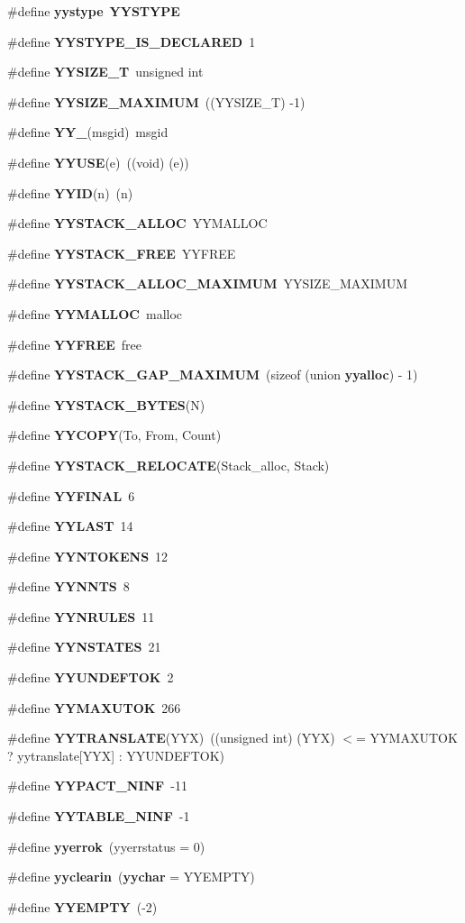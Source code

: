 \begin{DoxyCompactItemize}
\#define {\bf yystype}~{\bf YYSTYPE}
\item 
\#define {\bf YYSTYPE\_\-IS\_\-DECLARED}~1
\item 
\#define {\bf YYSIZE\_\-T}~unsigned int
\item 
\#define {\bf YYSIZE\_\-MAXIMUM}~((YYSIZE\_\-T) -\/1)
\item 
\#define {\bf YY\_\-}(msgid)~msgid
\item 
\#define {\bf YYUSE}(e)~((void) (e))
\item 
\#define {\bf YYID}(n)~(n)
\item 
\#define {\bf YYSTACK\_\-ALLOC}~YYMALLOC
\item 
\#define {\bf YYSTACK\_\-FREE}~YYFREE
\item 
\#define {\bf YYSTACK\_\-ALLOC\_\-MAXIMUM}~YYSIZE\_\-MAXIMUM
\item 
\#define {\bf YYMALLOC}~malloc
\item 
\#define {\bf YYFREE}~free
\item 
\#define {\bf YYSTACK\_\-GAP\_\-MAXIMUM}~(sizeof (union {\bf yyalloc}) -\/ 1)
\item 
\#define {\bf YYSTACK\_\-BYTES}(N)
\item 
\#define {\bf YYCOPY}(To, From, Count)
\item 
\#define {\bf YYSTACK\_\-RELOCATE}(Stack\_\-alloc, Stack)
\item 
\#define {\bf YYFINAL}~6
\item 
\#define {\bf YYLAST}~14
\item 
\#define {\bf YYNTOKENS}~12
\item 
\#define {\bf YYNNTS}~8
\item 
\#define {\bf YYNRULES}~11
\item 
\#define {\bf YYNSTATES}~21
\item 
\#define {\bf YYUNDEFTOK}~2
\item 
\#define {\bf YYMAXUTOK}~266
\item 
\#define {\bf YYTRANSLATE}(YYX)~((unsigned int) (YYX) $<$= YYMAXUTOK ? yytranslate[YYX] : YYUNDEFTOK)
\item 
\#define {\bf YYPACT\_\-NINF}~-\/11
\item 
\#define {\bf YYTABLE\_\-NINF}~-\/1
\item 
\#define {\bf yyerrok}~(yyerrstatus = 0)
\item 
\#define {\bf yyclearin}~({\bf yychar} = YYEMPTY)
\item 
\#define {\bf YYEMPTY}~(-\/2)
\item 

\end{DoxyCompactItemize}
